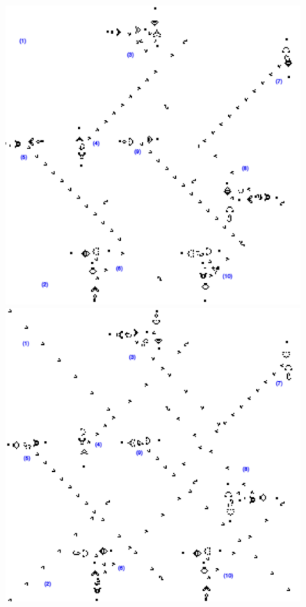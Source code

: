 \documentclass{article}
\theoremstyle{definition}
\theoremstyle{plain}
\theoremstyle{plain}
\begin{document}
\begin{figure}[H]
  \centering
  \begin{minipage}{0.45\textwidth}
    \centering
    \includegraphics[width=\linewidth]{figures/orNoGo.png}
  \end{minipage}\hfill
  \begin{minipage}{0.45\textwidth}
    \centering
    \includegraphics[width=\linewidth]{figures/orGo2.png}
  \end{minipage}


\end{figure}
\end{document}
